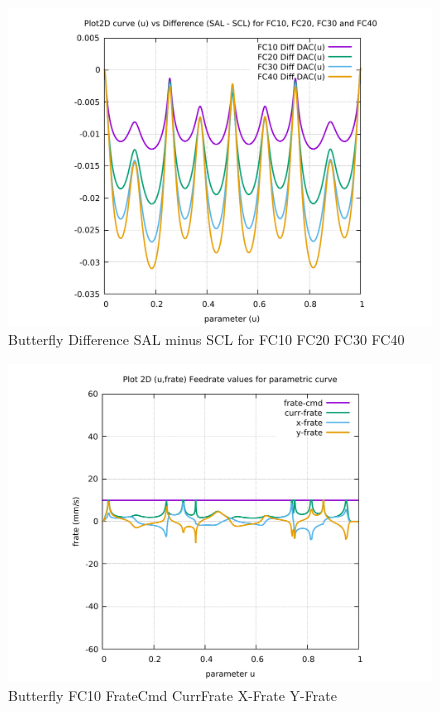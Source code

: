 \begin{figure}
	\caption     {Butterfly Difference SAL minus SCL for FC10 FC20 FC30 FC40}
	\label{26-img-Butterfly-Difference-SAL-minus-SCL-for-FC10-FC20-FC30-FC40.pdf}
\includegraphics[width=1.00\textwidth]{Chap4/appendix/app-Butterfly/plots/26-img-Butterfly-Difference-SAL-minus-SCL-for-FC10-FC20-FC30-FC40.pdf}
\end{figure}


\clearpage
\pagebreak

\begin{figure}
	\caption     {Butterfly FC10 FrateCmd CurrFrate X-Frate Y-Frate}
	\label{27-img-Butterfly-FC10-FrateCmd-CurrFrate-X-Frate-Y-Frate.pdf}
\includegraphics[width=1.00\textwidth]{Chap4/appendix/app-Butterfly/plots/27-img-Butterfly-FC10-FrateCmd-CurrFrate-X-Frate-Y-Frate.pdf}
\end{figure}


